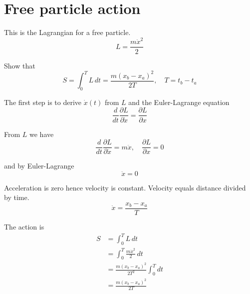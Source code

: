 

\section*{Free particle action}

This is the Lagrangian for a free particle.
\begin{equation*}
L=\frac{m\dot x^2}{2}
\end{equation*}

Show that
\begin{equation*}
S=\int_0^TL\,dt=\frac{m(x_b-x_a)^2}{2T},\quad T=t_b-t_a
\end{equation*}

The first step is to derive $\dot x(t)$ from $L$ and the Euler-Lagrange equation
\begin{equation*}
\frac{d}{dt}\frac{\partial L}{\partial\dot x}=\frac{\partial L}{\partial x}
\end{equation*}

From $L$ we have
\begin{equation*}
\frac{d}{dt}\frac{\partial L}{\partial\dot x}=m\ddot x,\quad
\frac{\partial L}{\partial x}=0
\end{equation*}

and by Euler-Lagrange
\begin{equation*}
\ddot x=0
\end{equation*}

Acceleration is zero hence velocity is constant.
Velocity equals distance divided by time.
\begin{equation*}
\dot x=\frac{x_b-x_a}{T}
\end{equation*}

The action is
\begin{align*}
S&=\int_0^TL\,dt
\\
&=\int_0^T\frac{m\dot x^2}{2}\,dt
\\
&=\frac{m(x_b-x_a)^2}{2T^2}\int_0^Tdt
\\
&=\frac{m(x_b-x_a)^2}{2T}
\tag{1}
\end{align*}


